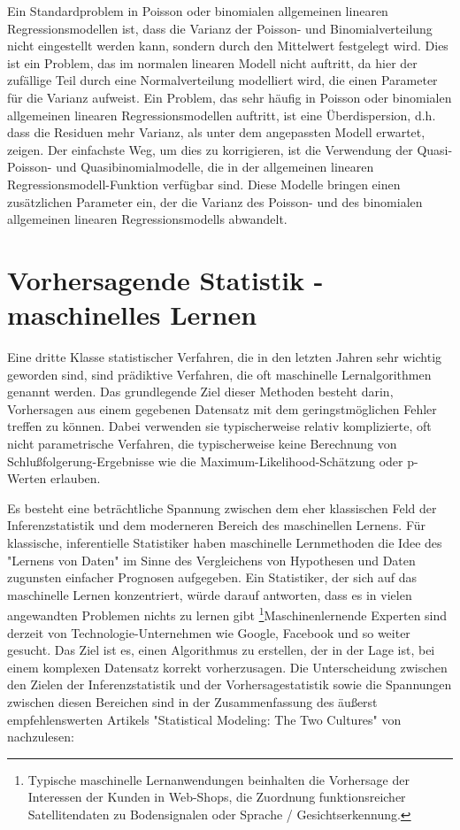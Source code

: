\documentclass[a4paper,twoside]{tufte-book}\usepackage[]{graphicx}\usepackage[]{color}
\begin{document}
Ein Standardproblem in Poisson oder binomialen allgemeinen linearen Regressionsmodellen ist, dass die Varianz der Poisson- und Binomialverteilung nicht eingestellt werden kann, sondern durch den Mittelwert festgelegt wird. Dies ist ein Problem, das im normalen linearen Modell nicht auftritt, da hier der zufällige Teil durch eine Normalverteilung modelliert wird, die einen Parameter für die Varianz aufweist. Ein Problem, das sehr häufig in Poisson oder binomialen allgemeinen linearen Regressionsmodellen auftritt, ist eine Überdispersion, d.h. dass die Residuen mehr Varianz, als unter dem angepassten Modell erwartet, zeigen.  Der einfachste Weg, um dies zu korrigieren, ist die Verwendung der Quasi-Poisson- und Quasibinomialmodelle, die in der allgemeinen linearen Regressionsmodell-Funktion verfügbar sind. Diese Modelle bringen einen zusätzlichen Parameter ein, der die Varianz des Poisson- und des binomialen allgemeinen linearen Regressionsmodells abwandelt.


\chapter{Vorhersagende Statistik - maschinelles Lernen}

Eine dritte Klasse statistischer Verfahren, die in den letzten Jahren sehr wichtig geworden sind, sind prädiktive Verfahren, die oft maschinelle Lernalgorithmen genannt werden. Das grundlegende Ziel dieser Methoden besteht darin, Vorhersagen aus einem gegebenen Datensatz mit dem geringstmöglichen Fehler treffen zu können. Dabei verwenden sie typischerweise relativ komplizierte, oft nicht parametrische Verfahren, die typischerweise keine Berechnung von Schlußfolgerung-Ergebnisse wie die Maximum-Likelihood-Schätzung oder p-Werten erlauben.

Es besteht eine beträchtliche Spannung zwischen dem eher klassischen Feld der Inferenzstatistik und dem moderneren Bereich des maschinellen Lernens. Für klassische, inferentielle Statistiker haben maschinelle Lernmethoden die Idee des "Lernens von Daten" im Sinne des Vergleichens von Hypothesen und Daten zugunsten einfacher Prognosen aufgegeben. Ein Statistiker, der sich auf das maschinelle Lernen konzentriert, würde darauf antworten, dass es in vielen angewandten Problemen nichts zu lernen gibt \footnote{Typische maschinelle Lernanwendungen beinhalten die Vorhersage der Interessen der Kunden in Web-Shops, die Zuordnung funktionsreicher Satellitendaten zu Bodensignalen oder Sprache / Gesichtserkennung.}Maschinenlernende Experten sind derzeit von Technologie-Unternehmen wie Google, Facebook und so weiter gesucht. Das Ziel ist es, einen Algorithmus zu erstellen, der in der Lage ist, bei einem komplexen Datensatz korrekt vorherzusagen. Die Unterscheidung zwischen den Zielen der Inferenzstatistik und der Vorhersagestatistik sowie die Spannungen zwischen diesen Bereichen sind in der Zusammenfassung des äußerst empfehlenswerten Artikels "Statistical Modeling: The Two Cultures" von \citet{Breiman-StatisticalModelingTwo-2001}nachzulesen:
\end{document}

